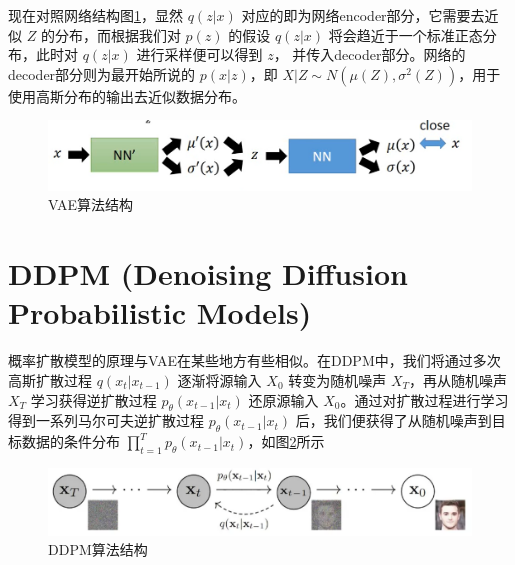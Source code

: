 \documentclass[12pt,a4paper,UTF8]{article}
\begin{document}
\indent 现在对照网络结构图\ref{vae2_img}，显然 $q\left(z|x\right)$ 对应的即为网络encoder部分，它需要去近似 $Z$ 的分布，而根据我们对 $p\left(z\right)$ 的假设 $q\left(z|x\right)$ 将会趋近于一个标准正态分布，此时对 $q\left(z|x\right)$ 进行采样便可以得到 $z$， 并传入decoder部分。网络的decoder部分则为最开始所说的 $p\left(x|z\right)$，即 $X|Z\sim N\left(\mu\left(Z\right),\sigma^2\left(Z\right)\right)$，用于使用高斯分布的输出去近似数据分布。

\begin{figure}[htb]\centering\includegraphics[scale=0.6]{./figure/5.png}\caption{VAE算法结构}\label{vae2_img}\end{figure}

\section{DDPM (Denoising Diffusion Probabilistic Models)}
\indent 概率扩散模型的原理与VAE在某些地方有些相似。在DDPM中，我们将通过多次高斯扩散过程 $q\left(x_t|x_{t-1}\right)$ 逐渐将源输入 $X_0$ 转变为随机噪声 $X_T$，再从随机噪声 $X_T$ 学习获得逆扩散过程 $p_\theta\left(x_{t-1}|x_t\right)$ 还原源输入 $X_0$。通过对扩散过程进行学习得到一系列马尔可夫逆扩散过程 $p_\theta\left(x_{t-1}|x_t\right)$ 后，我们便获得了从随机噪声到目标数据的条件分布 $\prod\limits_{t=1}^{T}p_\theta\left(x_{t-1}|x_t\right)$，如图\ref{ddpm_img}所示

\begin{figure}[htb]\centering\includegraphics[scale=0.6]{./figure/6.png}\caption{DDPM算法结构}\label{ddpm_img}\end{figure}
\end{document}
